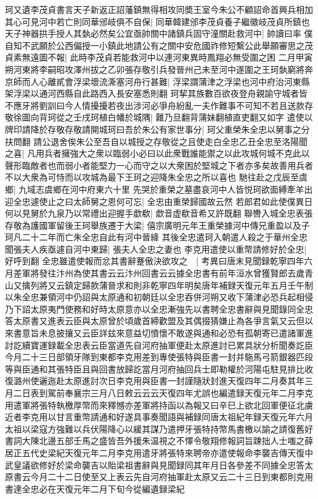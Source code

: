 珂又遺李茂貞書言天子新返正詔藩鎮無得相攻同奬王室今朱公不顧詔命首興兵相加其心可見河中若亡則同華邠岐俱不自保|{
	同華韓建邠李茂貞養子繼徽岐茂貞所鎮也}
天子神器拱手授人其埶必然矣公宜亟帥關中諸鎮兵固守潼關赴救河中|{
	帥讀曰率}
僕自知不武願於公西偏授一小鎮此地請公有之關中安危國祚修短繫公此舉願審思之茂貞素無遠圖不報|{
	此時李茂貞若能救河中以連河東異時鳳翔必無受圍之困}
二月甲寅朔河東將李嗣昭攻澤州拔之乙卯張存敬引兵發晉州己未至河中遂圍之王珂埶窮將奔京師而人心離貳會浮梁壞流澌塞河舟行甚難|{
	浮梁謂蒲津之浮梁也河中府治河東縣架浮梁以通河西縣自此路西入長安塞悉則翻}
珂挈其族數百欲夜登舟親諭守城者皆不應牙將劉訓曰今人情擾擾若夜出涉河必爭舟紛亂一夫作難事不可知不若且送款存敬徐圖向背珂從之壬戌珂植白幡於城隅|{
	難乃旦翻背蒲妹翻植直吏翻又如字}
遣使以牌印請降於存敬存敬請開城珂曰吾於朱公有家世事分|{
	珂父重榮朱全忠以舅事之分扶問翻}
請公退舍俟朱公至吾自以城授之存敬從之且使走白全忠乙丑全忠至洛陽聞之喜|{
	凡用兵者擁強大之衆以臨弱小必曰以此衆戰誰能禦之以此攻城何城不克此以聲形臨敵者也而弱小者能堅力一心而守之以大衆困於堅城之下者亦多矣故善用兵者不以大衆為可恃而以攻城為最下王珂之迎降朱全忠之所以喜也}
馳往赴之戊辰至虞鄉|{
	九域志虞鄉在河中府東六十里}
先哭於重榮之墓盡哀河中人皆悦珂欲面縛牽羊出迎全忠遽使止之曰太師舅之恩何可忘|{
	全忠由重榮歸國故云然}
若郎君如此使僕異日何以見舅於九泉乃以常禮出迎握手歔欷|{
	歔音虚欷音希又許既翻}
聯轡入城全忠表張存敬為護國軍留後王珂舉族遷于大梁|{
	僖宗廣明元年王重榮據河中傳兄重盈以及子珂凡二十二年而亡朱全忠自此有河中晉絳}
其後全忠遣珂入朝遣人殺之于華州全忠聞張夫人疾亟遽自河中東歸|{
	張夫人全忠之妻也}
李克用遣使以重幣請修好於全忠|{
	好呼到翻}
全忠雖遣使報而忿其書辭蹇傲決欲攻之　|{
	考異曰唐末見聞録乾寧四年六月差軍將發往汴州為使其書云云汴州回書云云據全忠書有前年洹水曾獲賢郎去歲青山又擒列將又云鎮定歸款蒲晉求和則非乾寧四年明矣唐年補録天復元年五月壬午制以朱全忠兼領河中仍詔與太原通和初朝廷以全忠吞併河朔又收下蒲津必恐兵起相侵乃下詔太原夷門使務和好時太原意亦以全忠漸強先以書聘全忠書辭與見聞錄同全忠答太原書又進表云臣與太原曾於頃歲首締歡盟及其偶掇猜嫌止為各爭言氣又云但以來書意旨未息披攘又云臣詳兹來意益切憤懷不敢遂與通和必恐有孤朝寄已遣諸軍進討訖續寶運録載全忠表云臣當道先自河府抽軍便赴太原進討已累具狀分析聞奏訖臣今月二十三日部領牙隊到東都李克用差到專使張特與臣書一封并駞馬弓箭銀器匹段等與臣通和其張特臣且與回書放歸訖當月河府抽回兵士即勒權於河陽屯駐見排比收復潞州使邐迤赴太原進討次日李克用與臣書一封謹隨狀封進天復四年二月奏其年三月二日表到駕前奉襄宗三月八日敕云云云天復四年尤誤也編遣録天復元年二月李克用遣軍將張特執檄厚幣而來釋憾亦差軍將持函以為報又曰辛巳上欲北回軍便征北虜近者李克用以甘言重幣請通和好遂具事奏聞語與補録同唐太祖紀年録天復元年六月太祖以梁寇方強難以兵伏陽降心以緩其謀乃遣押牙張特持幣馬書檄以諭之請復舊好書詞大陳北邊五部壬馬之盛皆吾外援朱温視之不懌令敬翔修報詞旨踈拙人士嗤之薛居正五代史梁紀天復元年二月李克用遣牙將張特來聘帝亦遣使報命李襲吉傳天復中武皇議欲修好於梁命襲吉以貽梁祖書辭與見聞録同其年月日各參差不同據全忠答太原書云今月二十二日使至又上表云先自河府抽軍赴太原又云二十三日到東都則克用書達全忠必在天復元年二月下旬今從編遺録梁紀}

